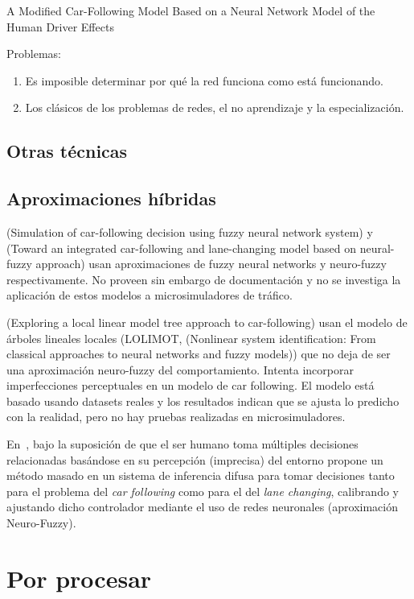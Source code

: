 A Modified Car-Following Model Based on a Neural Network Model of the Human Driver Effects


Problemas:

\begin{enumerate}
	\item Es imposible determinar por qué la red funciona como está funcionando.
	\item Los clásicos de los problemas de redes, el no aprendizaje y la especialización.
\end{enumerate}

\subsection{Otras técnicas}

\subsection{Aproximaciones híbridas}

(Simulation of car-following decision using fuzzy neural network system) y (Toward an integrated car-following and lane-changing model based on neural-fuzzy approach) usan aproximaciones de fuzzy neural networks y neuro-fuzzy respectivamente. No proveen sin embargo de documentación y no se investiga la aplicación de estos modelos a microsimuladores de tráfico.

(Exploring a local linear model tree approach to car-following) usan el modelo de árboles lineales locales (LOLIMOT, (Nonlinear system identification: From classical approaches to neural networks and fuzzy models)) que no deja de ser una aproximación neuro-fuzzy del comportamiento. Intenta incorporar imperfecciones perceptuales en un modelo de car following. El modelo está basado usando datasets reales y los resultados indican que se ajusta lo predicho con la realidad, pero no hay pruebas realizadas en microsimuladores.

En~\cite{Ma2004}, bajo la suposición de que el ser humano toma múltiples decisiones relacionadas basándose en su percepción (imprecisa) del entorno propone un método masado en un sistema de inferencia difusa para tomar decisiones tanto para el problema del \textit{car following} como para el del \textit{lane changing}, calibrando y ajustando dicho controlador mediante el uso de redes neuronales (aproximación Neuro-Fuzzy).

\section{Por procesar}



